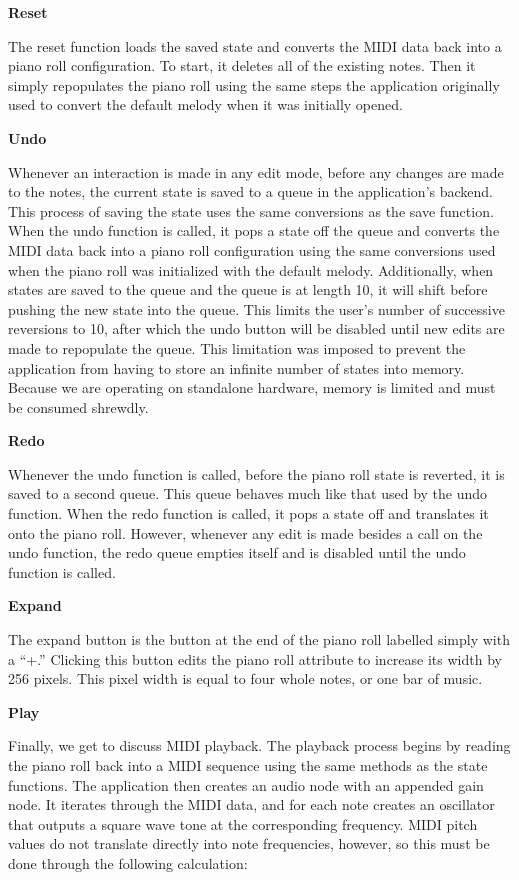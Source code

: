 \textbf{Reset}

The reset function loads the saved state and converts the MIDI data back into a piano roll
configuration. To start, it deletes all of the existing notes. Then it simply repopulates the piano
roll using the same steps the application originally used to convert the default melody when it was
initially opened.

\textbf{Undo}

Whenever an interaction is made in any edit mode, before any changes are made to the notes, the
 current state is saved to a queue in the application’s backend. This process of saving the state
 uses the same conversions as the save function. When the undo function is called, it pops a state
 off the queue and converts the MIDI data back into a piano roll configuration using the same
 conversions used when the piano roll was initialized with the default melody. Additionally, when
 states are saved to the queue and the queue is at length 10, it will shift before pushing the new
 state into the queue. This limits the user’s number of successive reversions to 10, after which
 the undo button will be disabled until new edits are made to repopulate the queue. This
 limitation was imposed to prevent the application from having to store an infinite number of
 states into memory. Because we are operating on standalone hardware, memory is limited and must be
 consumed shrewdly.

\textbf{Redo}

Whenever the undo function is called, before the piano roll state is reverted, it is saved to a
second queue. This queue behaves much like that used by the undo function. When the redo function
is called, it pops a state off and translates it onto the piano roll. However, whenever any edit is
made besides a call on the undo function, the redo queue empties itself and is disabled until the
undo function is called.

\textbf{Expand}

The expand button is the button at the end of the piano roll labelled simply with a “+.” Clicking
this button edits the piano roll attribute to increase its width by 256 pixels. This pixel width
is equal to four whole notes, or one bar of music.


\textbf{Play}

Finally, we get to discuss MIDI playback. The playback process begins by reading the piano roll
back into a MIDI sequence using the same methods as the state functions. The application then
creates an audio node with an appended gain node. It iterates through the MIDI data, and for each
note creates an oscillator that outputs a square wave tone at the corresponding frequency. MIDI
pitch values do not translate directly into note frequencies, however, so this must be done through
the following calculation:

